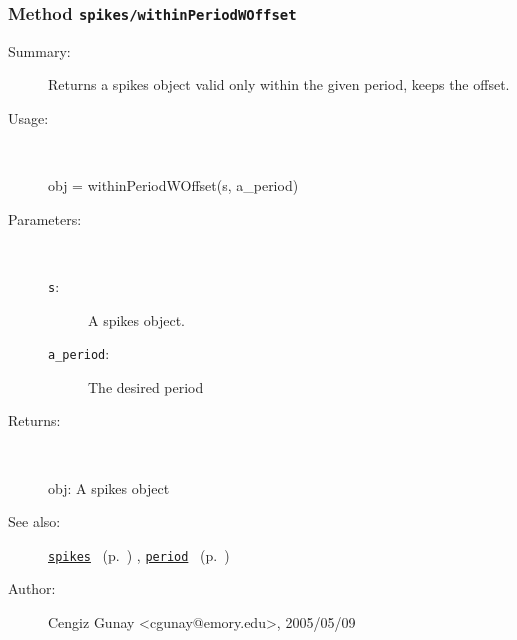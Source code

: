 \subsubsection[Method \texttt{withinPeriodWOffset}]{Method \texttt{spikes/withinPeriodWOffset}}%
%
\label{ref_spikes__withinPeriodWOffset}%
\hypertarget{ref_spikes__withinPeriodWOffset}{}%
\begin{description}
\item[Summary:]Returns a spikes object valid only within the given period, keeps the offset.
%
\item[Usage:]~%
\begin{lyxcode}%
obj = withinPeriodWOffset(s, a\_period)
%
\end{lyxcode}%
%
%
\item[Parameters:]~
\begin{description}%
\item[\texttt{s}:]
 A spikes object.
\item[\texttt{a\_period}:]
 The desired period 
\end{description}%
%
\item[Returns:]~

	obj: A spikes object
%
%
\item[See also:]%
\hyperlink{ref_spikes}{\texttt{spikes}}%
\ (p.~\pageref{ref_spikes})%
%
, \hyperlink{ref_period}{\texttt{period}}%
\ (p.~\pageref{ref_period})%
%
%
\item[Author:]%
Cengiz Gunay <cgunay@emory.edu>, 2005/05/09%
\end{description}
\methodline%
